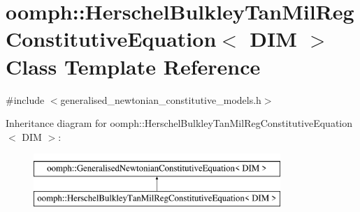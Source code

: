 \hypertarget{classoomph_1_1HerschelBulkleyTanMilRegConstitutiveEquation}{}\section{oomph\+:\+:Herschel\+Bulkley\+Tan\+Mil\+Reg\+Constitutive\+Equation$<$ D\+IM $>$ Class Template Reference}
\label{classoomph_1_1HerschelBulkleyTanMilRegConstitutiveEquation}


{\ttfamily \#include $<$generalised\+\_\+newtonian\+\_\+constitutive\+\_\+models.\+h$>$}

Inheritance diagram for oomph\+:\+:Herschel\+Bulkley\+Tan\+Mil\+Reg\+Constitutive\+Equation$<$ D\+IM $>$\+:\begin{figure}[H]
\begin{center}
\leavevmode
\includegraphics[height=2.000000cm]{classoomph_1_1HerschelBulkleyTanMilRegConstitutiveEquation}
\end{center}
\end{figure}
